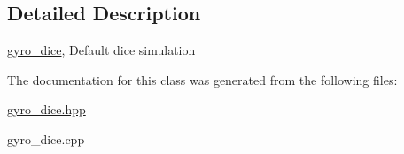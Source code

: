 \subsection{Detailed Description}
\hyperlink{classgyro__dice}{gyro\+\_\+dice}, Default dice simulation 

The documentation for this class was generated from the following files\+:\begin{DoxyCompactItemize}
\item 
\hyperlink{gyro__dice_8hpp}{gyro\+\_\+dice.\+hpp}\item 
gyro\+\_\+dice.\+cpp\end{DoxyCompactItemize}
